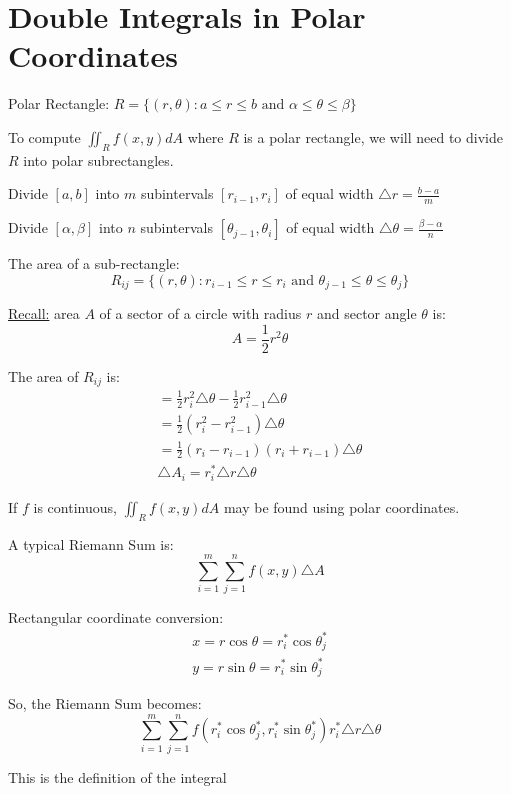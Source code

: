 \documentclass[12pt]{article}
\begin{document}
\section{Double Integrals in Polar Coordinates}
Polar Rectangle: \(R = \{(r,\theta): a \leq r \leq b \text{ and } \alpha \leq \theta \leq \beta\}\)

To compute \(\iint_{R}f(x,y)dA\) where \(R\) is a polar rectangle, we will need to divide \(R\) into polar subrectangles.

Divide \([a,b]\) into \(m\) subintervals \([r_{i-1},r_i]\) of equal width \(\triangle r = \frac{b-a}{m}\)

Divide \([\alpha,\beta]\) into \(n\) subintervals \([\theta_{j-1},\theta_i]\) of equal width \(\triangle \theta = \frac{\beta - \alpha}{n}\)

The area of a sub-rectangle:
\[
	R_{ij} = \{(r,\theta): r_{i-1} \leq r \leq r_i \text{ and } \theta_{j-1} \leq \theta \leq \theta_j\}
\]

\underline{Recall:} area \(A\) of a sector of a circle with radius \(r\) and sector angle \(\theta\) is: \[
	A = \frac{1}{2}r^2\theta
\]

The area of \(R_{ij}\) is: 
\begin{align*}
	= \frac{1}{2} r^2_i \triangle \theta - \frac{1}{2}r^2_{i-1}\triangle \theta \\
	= \frac{1}{2}(r^2_i - r^2_{i-1}) \triangle \theta \\
	= \frac{1}{2}(r_i - r_{i-1}) (r_i + r_{i-1}) \triangle \theta \\
	\triangle A_i = r_i^* \triangle r \triangle \theta
\end{align*}

If \(f\) is continuous, \(\iint_{R}f(x,y)dA\) may be found using polar coordinates.

A typical Riemann Sum is: 
\[
	\sum_{i=1}^{m} \sum_{j = 1}^{n} f(x,y) \triangle A
\]

Rectangular coordinate conversion: 
\begin{align*}
	\label{eq:Conversions}
	x  = r\cos\theta = r_i^*\cos \theta^*_j \\
	y = r\sin\theta = r_i^*\sin \theta_j^*
\end{align*}

So, the Riemann Sum becomes:
\[
	\sum_{i = 1}^{m} \sum_{j = 1}^{n} f(r_i^*\cos \theta^*_j ,r_i^*\sin \theta_j^*) r_i^* \triangle r \triangle \theta 
\]

This is the definition of the integral 
\end{document}
